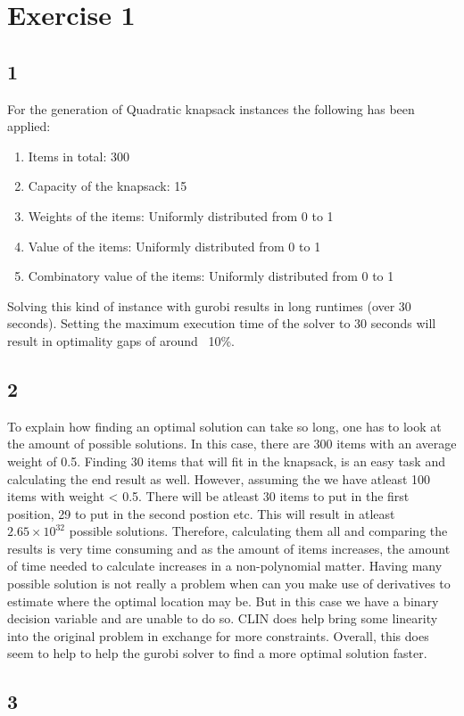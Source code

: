 \section*{Exercise 1}
\subsection*{1}
For the generation of Quadratic knapsack instances the following has been applied:
\begin{enumerate}
	\item Items in total: 300
	\item Capacity of the knapsack: 15
	\item Weights of the items: Uniformly distributed from 0 to 1
	\item Value of the items: Uniformly distributed from 0 to 1
	\item Combinatory value of the items: Uniformly distributed from 0 to 1
\end{enumerate}
Solving this kind of instance with gurobi results in long runtimes (over 30 seconds). Setting the maximum execution time of the solver to 30 seconds will result in optimality gaps of around ~10\%.
\subsection*{2}
To explain how finding an optimal solution can take so long, one has to look at the amount of possible solutions. In this case, there are 300 items with an average weight of 0.5. Finding 30 items that will fit in the knapsack, is an easy task and calculating the end result as well. However, assuming the we have atleast 100 items with weight < 0.5. There will be atleast 30 items to put in the first position, 29 to put in the second postion etc. This will result in atleast $2.65 \times 10^{32}$ possible solutions. Therefore, calculating them all and comparing the results is very time consuming and as the amount of items increases, the amount of time needed to calculate increases in a non-polynomial matter. Having many possible solution is not really a problem when can you make use of derivatives to estimate where the optimal location may be. But in this case we have a binary decision variable and are unable to do so. CLIN does help bring some linearity into the original problem in exchange for more constraints. Overall, this does seem to help to help the gurobi solver to find a more optimal solution faster.
\subsection*{3}
